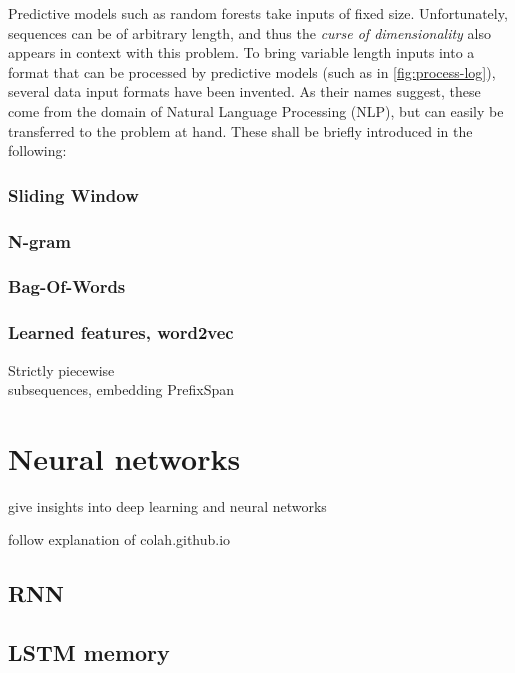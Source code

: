 Predictive models such as random forests take inputs of fixed size. Unfortunately, sequences can be of arbitrary length, and thus the \textit{curse of dimensionality} also appears in context with this problem. To bring variable length inputs into a format that can be processed by predictive models (such as in \autoref{fig:process-log}), several data input formats have been invented. As their names suggest, these come from the domain of Natural Language Processing (NLP), but can easily be transferred to the problem at hand. These shall be briefly introduced in the following:

\subsubsection{Sliding Window}
\subsubsection{N-gram}
\subsubsection{Bag-Of-Words}
\subsubsection{Learned features, word2vec}
Strictly piecewise\\
subsequences, embedding
PrefixSpan

\section{Neural networks}
give insights into deep learning and neural networks 

follow explanation of colah.github.io

\subsection{RNN}
\subsection{LSTM memory}